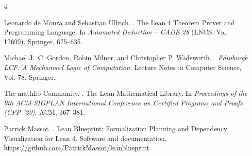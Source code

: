 \documentclass[10pt,a4paper,fontset=fandol]{ctexart}
\begin{document}
\begin{thebibliography}{4}

Leonardo de Moura and Sebastian Ullrich.
.
\newblock The Lean 4 Theorem Prover and Programming Language.
\newblock In \emph{Automated Deduction -- CADE 28} (LNCS, Vol. 12699). Springer, 625--635.

Michael J.~C. Gordon, Robin Milner, and Christopher P. Wadsworth.
.
\newblock \emph{Edinburgh LCF: A Mechanised Logic of Computation}.
\newblock Lecture Notes in Computer Science, Vol. 78. Springer.

The mathlib Community.
.
\newblock The Lean Mathematical Library.
\newblock In \emph{Proceedings of the 9th ACM SIGPLAN International Conference on Certified Programs and Proofs (CPP '20)}. ACM, 367--381.

Patrick Massot.
.
\newblock Lean Blueprint: Formalization Planning and Dependency Visualization for Lean 4.
\newblock Software and documentation, \url{https://github.com/PatrickMassot/leanblueprint}.

\end{thebibliography}
\end{document}
